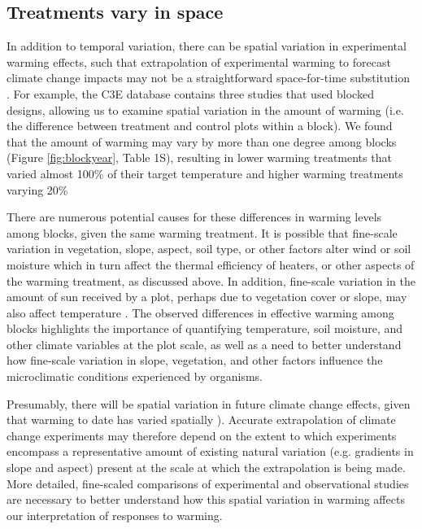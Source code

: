 \documentclass{article}
\begin{document}
\subsection* {Treatments vary in space}
In addition to temporal variation, there can be spatial variation in experimental warming effects, such that extrapolation of experimental warming to forecast climate change impacts may not be a straightforward space-for-time substitution \citep{johnson2008,jochner2013}. For example, the C3E database contains three studies that used blocked designs, allowing us to examine spatial variation in the amount of warming (i.e. the difference between treatment and control plots within a block). We found that the amount of warming may vary by more than one degree among blocks (Figure \ref{fig:blockyear}, Table 1S), resulting in lower warming treatments that varied almost 100\% of their target temperature and higher warming treatments varying 20\% %
\par There are numerous potential causes for these differences in warming levels among blocks, given the same warming treatment. It is possible that fine-scale variation in vegetation, slope, aspect, soil type, or other factors alter wind or soil moisture which in turn affect the thermal efficiency of heaters, or other aspects of the warming treatment, as discussed above\citep{peterjohn1993,kimball2005,kimball2008,hoeppner2012}.  In addition, fine-scale variation in the amount of sun received by a plot, perhaps due to vegetation cover or slope, may also affect temperature \citep{rollinson2015}. The observed differences in effective warming among blocks highlights the importance of quantifying temperature, soil moisture, and other climate variables at the plot scale, as well as a need to better understand how fine-scale variation in slope, vegetation, and other factors influence the microclimatic conditions experienced by organisms.  
\par Presumably, there will be spatial variation in future climate change effects, given that warming to date has varied spatially \citep{ipcc2013}).  Accurate extrapolation of climate change experiments may therefore depend on the extent to which experiments encompass a representative amount of existing natural variation (e.g. gradients in slope and aspect) present at the scale at which the extrapolation is being made. More detailed, fine-scaled comparisons of experimental and observational studies are necessary to better understand how this spatial variation in warming affects our interpretation of responses to warming. 
\end{document}
